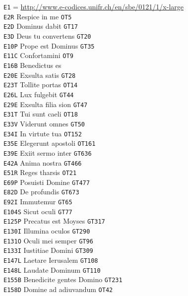 \documentclass[a4paper]{article}
\begin{document}
{\begin{multicols}{2}
\noindent
\texttt{E1} = \url{http://www.e-codices.unifr.ch/en/sbe/0121/1/x-large}\\
\texttt{E2R} Respice in me \texttt{OT5}\\
\texttt{E2D} Dominus dabit \texttt{GT17}\\
\texttt{E3D} Deus tu convertens \texttt{GT20}\\
\texttt{E10P} Prope est Dominus \texttt{GT35}\\
\texttt{E11C} Confortamini \texttt{OT9}\\
\texttt{E16B} Benedictus es\\
\texttt{E20E} Exsulta satis \texttt{GT28}\\
\texttt{E23T} Tollite portas \texttt{OT14}\\
\texttt{E26L} Lux fulgebit \texttt{GT44}\\
\texttt{E29E} Exsulta filia sion \texttt{GT47}\\
\texttt{E31T} Tui sunt caeli \texttt{OT18}\\
\texttt{E33V} Viderunt omnes \texttt{GT50}\\
\texttt{E34I} In virtute tua \texttt{OT152}\\
\texttt{E35E} Elegerunt apostoli \texttt{OT161}\\
\texttt{E39E} Exiit sermo inter \texttt{GT636}\\
\texttt{E42A} Anima nostra \texttt{GT466}\\
\texttt{E51R} Reges tharsis \texttt{OT21}\\
\texttt{E69P} Posuisti Domine \texttt{GT477}\\
\texttt{E82D} De profundis \texttt{GT673}\\
\texttt{E92I} Immutemur \texttt{GT65}\\
\texttt{E104S} Sicut oculi \texttt{GT77}\\
\texttt{E125P} Precatus est Moyses \texttt{GT317}\\
\texttt{E130I} Illumina oculos \texttt{GT290}\\
\texttt{E131O} Oculi mei semper \texttt{GT96}\\
\texttt{E133I} Iustitiae Domini \texttt{GT309}\\
\texttt{E147L} Laetare Ierusalem \texttt{GT108}\\
\texttt{E148L} Laudate Dominum \texttt{GT110}\\
\texttt{E155B} Benedicite gentes Domino \texttt{GT231}\\
\texttt{E158D} Domine ad adiuvandum \texttt{OT42}\\

\end{multicols}}
\end{document}
